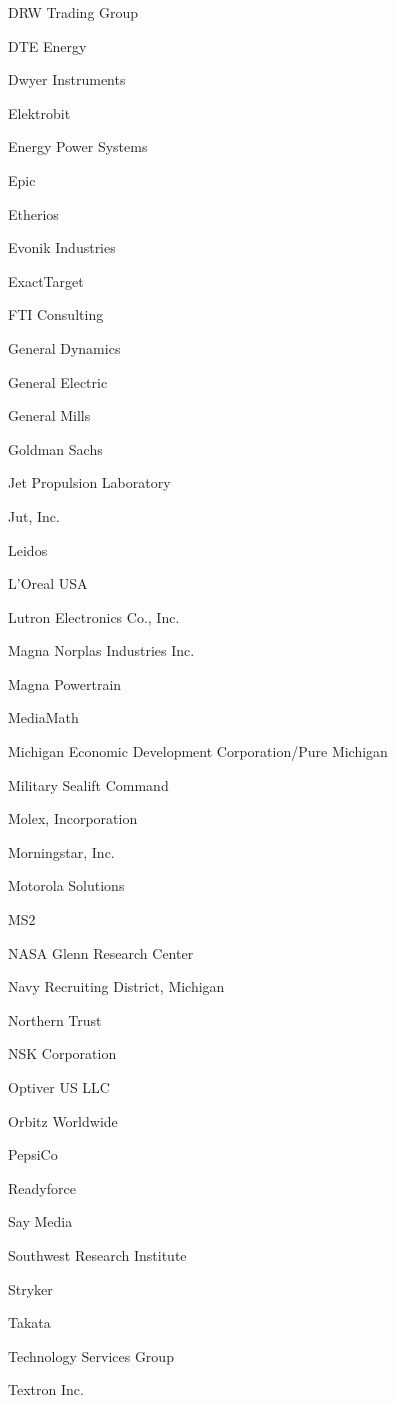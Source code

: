 \documentclass[twoside]{article}
\begin{document}
\begin{center}
\begin{multicols}{5}
\begin{FlushLeft}
\begin{compactitem}
\item DRW Trading Group
\item DTE Energy
\item Dwyer Instruments
\item Elektrobit
\item Energy Power Systems
\item Epic
\item Etherios
\item Evonik Industries
\item ExactTarget
\item FTI Consulting
\item General Dynamics
\item General Electric
\item General Mills
\item Goldman Sachs
\item Jet Propulsion Laboratory
\item Jut, Inc.
\item Leidos
\item L'Oreal USA
\item Lutron Electronics Co., Inc.
\item Magna Norplas Industries Inc.
\item Magna Powertrain
\item MediaMath
\item Michigan Economic Development Corporation/Pure Michigan
\item Military Sealift Command
\item Molex, Incorporation
\item Morningstar, Inc.
\item Motorola Solutions
\item MS2
\item NASA Glenn Research Center
\item Navy Recruiting District, Michigan
\item Northern Trust
\item NSK Corporation
\item Optiver US LLC
\item Orbitz Worldwide
\item PepsiCo
\item Readyforce
\item Say Media
\item Southwest Research Institute
\item Stryker
\item Takata
\item Technology Services Group
\item Textron Inc.

\end{compactitem}
\end{FlushLeft}
\end{multicols}
\end{center}
\end{document}
